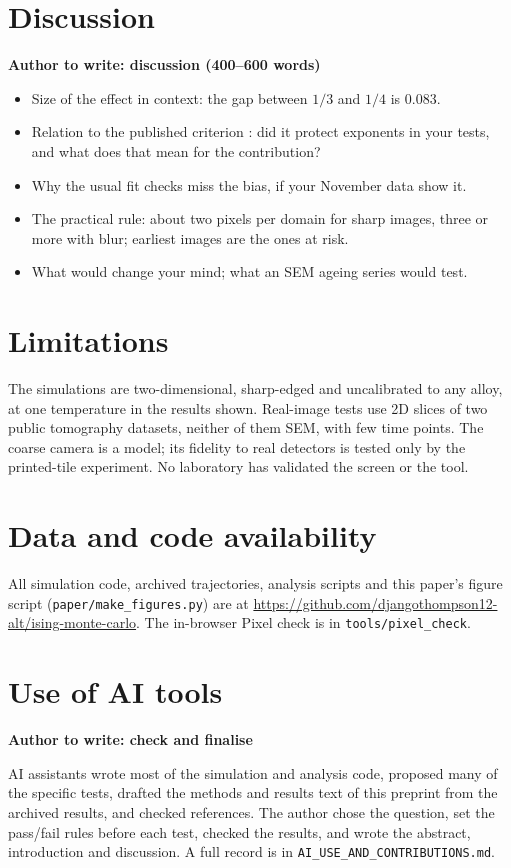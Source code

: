 \documentclass[11pt,a4paper]{article}
\newenvironment{authorbox}[1]{\begin{framed}\noindent\textcolor{todo}{\textbf{Author to write: #1}}\par\small}{\end{framed}}
\begin{document}
\section{Discussion}
\begin{authorbox}{discussion (400--600 words)}
\begin{itemize}
\item Size of the effect in context: the gap between $1/3$ and $1/4$ is 0.083.
\item Relation to the published criterion \cite{ledesma2018}: did it protect
exponents in your tests, and what does that mean for the contribution?
\item Why the usual fit checks miss the bias, if your November data show it.
\item The practical rule: about two pixels per domain for sharp images, three
or more with blur; earliest images are the ones at risk.
\item What would change your mind; what an SEM ageing series would test.
\end{itemize}
\end{authorbox}

\section{Limitations}
The simulations are two-dimensional, sharp-edged and uncalibrated to any alloy,
at one temperature in the results shown. Real-image tests use 2D slices of two
public tomography datasets, neither of them SEM, with few time points. The
coarse camera is a model; its fidelity to real detectors is tested only by the
printed-tile experiment. No laboratory has validated the screen or the tool.

\section*{Data and code availability}
All simulation code, archived trajectories, analysis scripts and this paper's
figure script (\texttt{paper/make\_figures.py}) are at
\url{https://github.com/djangothompson12-alt/ising-monte-carlo}. The
in-browser Pixel check is in \texttt{tools/pixel\_check}.

\section*{Use of AI tools}
\begin{authorbox}{check and finalise}
AI assistants wrote most of the simulation and analysis code, proposed many of
the specific tests, drafted the methods and results text of this preprint from
the archived results, and checked references. The author chose the question,
set the pass/fail rules before each test, checked the results, and wrote the
abstract, introduction and discussion. A full record is in
\texttt{AI\_USE\_AND\_CONTRIBUTIONS.md}.
\end{authorbox}
\end{document}
